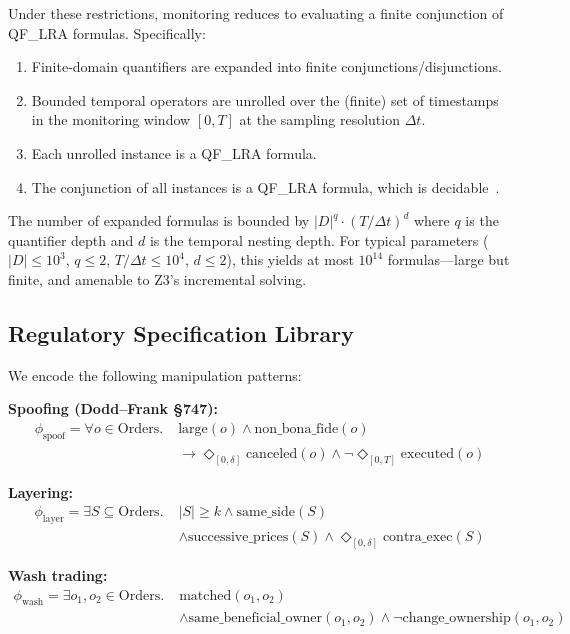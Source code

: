 \documentclass[11pt]{article}
\begin{document}
Under these restrictions, monitoring reduces to evaluating a finite conjunction of QF\_LRA formulas.
Specifically:
\begin{enumerate}[nosep]
  \item Finite-domain quantifiers are expanded into finite conjunctions/disjunctions.
  \item Bounded temporal operators are unrolled over the (finite) set of timestamps in the monitoring window $[0, T]$ at the sampling resolution $\Delta t$.
  \item Each unrolled instance is a QF\_LRA formula.
  \item The conjunction of all instances is a QF\_LRA formula, which is decidable~\cite{demoura2008}.
\end{enumerate}

The number of expanded formulas is bounded by $|D|^q \cdot (T/\Delta t)^d$ where $q$ is the quantifier depth and $d$ is the temporal nesting depth.
For typical parameters ($|D| \leq 10^3$, $q \leq 2$, $T/\Delta t \leq 10^4$, $d \leq 2$), this yields at most $10^{14}$ formulas---large but finite, and amenable to Z3's incremental solving.

\subsection{Regulatory Specification Library}

We encode the following manipulation patterns:

\textbf{Spoofing (Dodd--Frank \S747):}
\begin{align*}
  \phi_{\text{spoof}} = \forall o \in \text{Orders}.\; &\text{large}(o) \land \text{non\_bona\_fide}(o) \\
  &\to \Diamond_{[0,\delta]} \text{canceled}(o) \land \neg\Diamond_{[0,T]} \text{executed}(o)
\end{align*}

\textbf{Layering:}
\begin{align*}
  \phi_{\text{layer}} = \exists S \subseteq \text{Orders}.\; &|S| \geq k \land \text{same\_side}(S) \\
  &\land \text{successive\_prices}(S) \land \Diamond_{[0,\delta]} \text{contra\_exec}(S)
\end{align*}

\textbf{Wash trading:}
\begin{align*}
  \phi_{\text{wash}} = \exists o_1, o_2 \in \text{Orders}.\; &\text{matched}(o_1, o_2) \\
  &\land \text{same\_beneficial\_owner}(o_1, o_2) \land \neg\text{change\_ownership}(o_1, o_2)
\end{align*}
\end{document}
